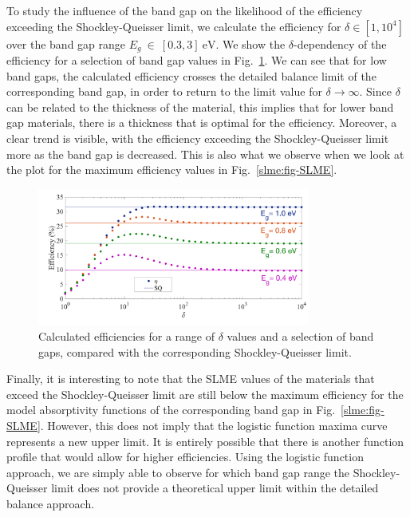\begin{refsection}
To study the influence of the band gap on the likelihood of the efficiency 
exceeding the Shockley-Queisser limit, we calculate the efficiency for $\delta 
\in [1, 10^4]$ over the band gap range $E_g~\in~[0.3, 3]~\si{\electronvolt}$. 
We show the $\delta$-dependency of the efficiency for a selection of band gap 
values in Fig.~\ref{slme:fig-deltadep}. We can see that for low band gaps, the 
calculated efficiency crosses the detailed balance limit of the corresponding 
band gap, in order to return to the limit value for $\delta \rightarrow 
\infty$. Since $\delta$ can be related to the thickness of the material, this 
implies that for lower band gap materials, there is a thickness that is 
optimal for the efficiency. Moreover, a clear trend is visible, with the 
efficiency exceeding the Shockley-Queisser limit more as the band gap is 
decreased. This is also what we observe when we look at the plot for the 
maximum efficiency values in Fig.~\ref{slme:fig-SLME}. 
 
\begin{figure}[h!] 
\centering 
\includegraphics[width=0.8\textwidth]{Figures/slme/sq_Fig3.png} 
\caption{Calculated efficiencies for a range of $\delta$ values and a 
selection of band gaps, compared with the corresponding Shockley-Queisser 
limit.} 
\label{slme:fig-deltadep} 
\end{figure} 
 
Finally, it is interesting to note that the SLME values of the materials that 
exceed the Shockley-Queisser limit are still below the maximum efficiency for 
the model absorptivity functions of the corresponding band gap in 
Fig.~\ref{slme:fig-SLME}. However, this does not imply that the logistic 
function maxima curve represents a new upper limit. It is entirely possible 
that there is another function profile that would allow for higher 
efficiencies. Using the logistic function approach, we are simply able to 
observe for which band gap range the Shockley-Queisser limit does not provide 
a theoretical upper limit within the detailed balance approach. 
 

\end{refsection}
